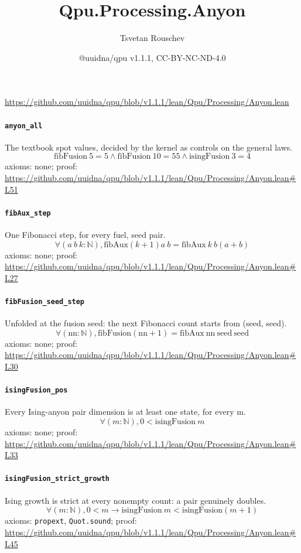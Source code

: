 \documentclass[11pt]{article}
\title{Qpu.Processing.Anyon}
\author{Tsvetan Rouschev}
\date{@uuidna/qpu v1.1.1, CC-BY-NC-ND-4.0}
\begin{document}
\maketitle
\noindent\url{https://github.com/uuidna/qpu/blob/v1.1.1/lean/Qpu/Processing/Anyon.lean}

\paragraph{\texttt{anyon\_all}}
The textbook spot values, decided by the kernel as controls on the general laws.
\[ \mathrm{fibFusion}\ 5 = 5 \land \mathrm{fibFusion}\ 10 = 55 \land \mathrm{isingFusion}\ 3 = 4 \]
\noindent axioms: none; proof: \url{https://github.com/uuidna/qpu/blob/v1.1.1/lean/Qpu/Processing/Anyon.lean\#L51}

\paragraph{\texttt{fibAux\_step}}
One Fibonacci step, for every fuel, seed pair.
\[ \forall (a\ b\ k : \mathbb{N}), \mathrm{fibAux} (k + 1) a\ b = \mathrm{fibAux}\ k\ b (a + b) \]
\noindent axioms: none; proof: \url{https://github.com/uuidna/qpu/blob/v1.1.1/lean/Qpu/Processing/Anyon.lean\#L27}

\paragraph{\texttt{fibFusion\_seed\_step}}
Unfolded at the fusion seed: the next Fibonacci count starts from (seed, seed).
\[ \forall (\mathrm{nn} : \mathbb{N}), \mathrm{fibFusion} (\mathrm{nn} + 1) = \mathrm{fibAux}\ \mathrm{nn}\ \mathrm{seed}\ \mathrm{seed} \]
\noindent axioms: none; proof: \url{https://github.com/uuidna/qpu/blob/v1.1.1/lean/Qpu/Processing/Anyon.lean\#L30}

\paragraph{\texttt{isingFusion\_pos}}
Every Ising-anyon pair dimension is at least one state, for every m.
\[ \forall (m : \mathbb{N}), 0 < \mathrm{isingFusion}\ m \]
\noindent axioms: none; proof: \url{https://github.com/uuidna/qpu/blob/v1.1.1/lean/Qpu/Processing/Anyon.lean\#L33}

\paragraph{\texttt{isingFusion\_strict\_growth}}
Ising growth is strict at every nonempty count: a pair genuinely doubles.
\[ \forall (m : \mathbb{N}), 0 < m \to \mathrm{isingFusion}\ m < \mathrm{isingFusion} (m + 1) \]
\noindent axioms: \texttt{propext}, \texttt{Quot.sound}; proof: \url{https://github.com/uuidna/qpu/blob/v1.1.1/lean/Qpu/Processing/Anyon.lean\#L45}
\end{document}
